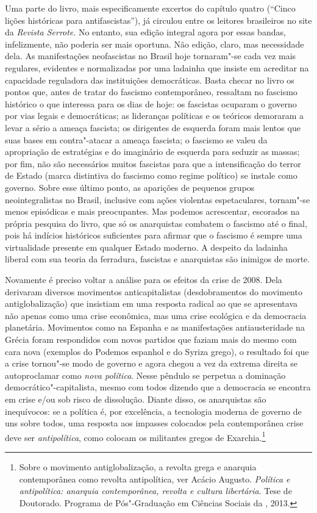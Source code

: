 Uma parte do livro, mais especificamente excertos do capítulo quatro
(``Cinco lições históricas para antifascistas''), já circulou entre os
leitores brasileiros no site da \emph{Revista Serrote}. No entanto, sua edição
integral agora por essas bandas, infelizmente, não poderia ser mais
oportuna. Não edição, claro, mas necessidade dela. As manifestações
neofascistas no Brasil hoje tornaram"-se cada vez mais regulares,
evidentes e normalizadas por uma ladainha que insiste em acreditar na
capacidade reguladora das instituições democráticas. Basta checar no
livro os pontos que, antes de tratar do fascismo contemporâneo,
ressaltam no fascismo histórico o que interessa para os dias de hoje: os
fascistas ocuparam o governo por vias legais e democráticas; as
lideranças políticas e os teóricos demoraram a levar a sério a ameaça
fascista; os dirigentes de esquerda foram mais lentos que suas bases em
contra"-atacar a ameaça fascista; o fascismo se valeu da apropriação de
estratégias e do imaginário de esquerda para seduzir as massas; por fim,
não são necessários muitos fascistas para que a intensificação do terror
de Estado (marca distintiva do fascismo como regime político) se instale
como governo. Sobre esse último ponto, as aparições de pequenos grupos
neointegralistas no Brasil, inclusive com ações violentas espetaculares,
tornam"-se menos episódicas e mais preocupantes. Mas podemos acrescentar,
escorados na própria pesquisa do livro, que só os anarquistas combatem o
fascismo até o final, pois há indícios históricos suficientes para
afirmar que o fascismo é sempre uma virtualidade presente em qualquer
Estado moderno. A despeito da ladainha liberal com sua teoria da
ferradura, fascistas e anarquistas são inimigos de morte.

Novamente é preciso voltar a análise para os efeitos da crise de 2008.
Dela derivaram diversos movimentos anticapitalistas (desdobramentos do
movimento antiglobalização) que insistiam em uma resposta radical
ao que se apresentava não apenas como uma crise econômica, mas uma crise
ecológica e da democracia planetária. Movimentos como  na Espanha e
as manifestações antiausteridade na Grécia foram respondidos com novos
partidos que faziam mais do mesmo com cara nova (exemplos do Podemos
espanhol e do Syriza grego), o resultado foi que a crise tornou"-se modo
de governo e agora chegou a vez da extrema direita se autoproclamar como
\emph{nova política}. Nesse pêndulo se perpetua a dominação
democrático"-capitalista, mesmo com todos dizendo que a democracia se
encontra em crise e/ou sob risco de dissolução. Diante disso, os
anarquistas são inequívocos: se a política é, por excelência, a
tecnologia moderna de governo de uns sobre todos, uma resposta aos
impasses colocados pela contemporânea crise deve ser
\emph{antipolítica}, como colocam os militantes gregos de
Exarchia.\footnote{Sobre o movimento antiglobalização, a revolta grega e
  anarquia contemporânea como revolta antipolítica, ver Acácio Augusto.
  \emph{Política e antipolítica: anarquia contemporânea, revolta e
  cultura libertária}. Tese de Doutorado. Programa de Pós"-Graduação em
  Ciências Sociais da , 2013.}

